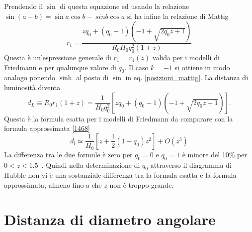 Prendendo il $\sin$ di questa equazione ed usando la relazione $\sin(a-b)= \sin
a \cos b - \ sin b \cos a$ si ha infine la relazione di Mattig
\begin{equation}
  r_1 = \frac{z q_0 +(q_0-1) (-1+\sqrt{2q_0z+1})}{R_0 H_0 q^2_0 (1+z)}
  \label{mattig}
\end{equation}
Questa è un'espressione generale di $r_1=r_1(z)$ valida per i modelli di
Friedmann e per qualunque valore di $q_0$.  Il caso $k=-1$ si ottiene in modo
analogo ponendo $\sinh $ al posto di $\sin$ in eq. \eqref{posizioni_mattig}.  La
distanza di luminosità diventa
\begin{equation}
  d_L \equiv R_0 r_1 (1+z) = \frac{1}{H_0 q^2_0} \left[ z q_0 +(q_0-1)
    (-1+\sqrt{2q_0z+1}) \right].
\label{15324}
\end{equation}
Questa è la formula esatta per i modelli di Friedmann da comparare con la
formula approssimata \eqref{1468}
\begin{equation}
  d_l \simeq \frac{1}{H_0} [z + \frac{1}{2} (1-q_0) z^2] + O(z^3)
\end{equation}
La differenza tra le due formule è zero per $q_0=0$ e $q_0=1$ è minore del 10\%
per $0<z<1.5$~\parencite{weinberg:gravitation}.  Quindi nella determinazione di
$q_0$ attraverso il diagramma di Hubble non vi è una sostanziale differenza tra
la formula esatta e la formula approssimata, almeno fino a che $z$ non è troppo
grande.

\section{Distanza di diametro angolare}

